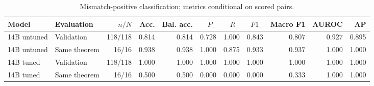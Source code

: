 \begin{table}[htbp]
\centering
\caption{Mismatch-positive classification; metrics conditional on scored pairs.}
\label{tab:random-swap-metrics}
\small
\begin{adjustbox}{max width=\textwidth}
\begin{tabular}{llrrrrrrrrr}
\toprule
Model & Evaluation & $n/N$ & Acc. & Bal. acc. & $P_-$ & $R_-$ & $F1_-$ & Macro F1 & AUROC & AP \\
\midrule
14B untuned & Validation & 118/118 & 0.814 & 0.814 & 0.728 & 1.000 & 0.843 & 0.807 & 0.927 & 0.895 \\
14B untuned & Same theorem & 16/16 & 0.938 & 0.938 & 1.000 & 0.875 & 0.933 & 0.937 & 1.000 & 1.000 \\
14B tuned & Validation & 118/118 & 1.000 & 1.000 & 1.000 & 1.000 & 1.000 & 1.000 & 1.000 & 1.000 \\
14B tuned & Same theorem & 16/16 & 0.500 & 0.500 & 0.000 & 0.000 & 0.000 & 0.333 & 1.000 & 1.000 \\
\bottomrule
\end{tabular}
\end{adjustbox}
\end{table}
